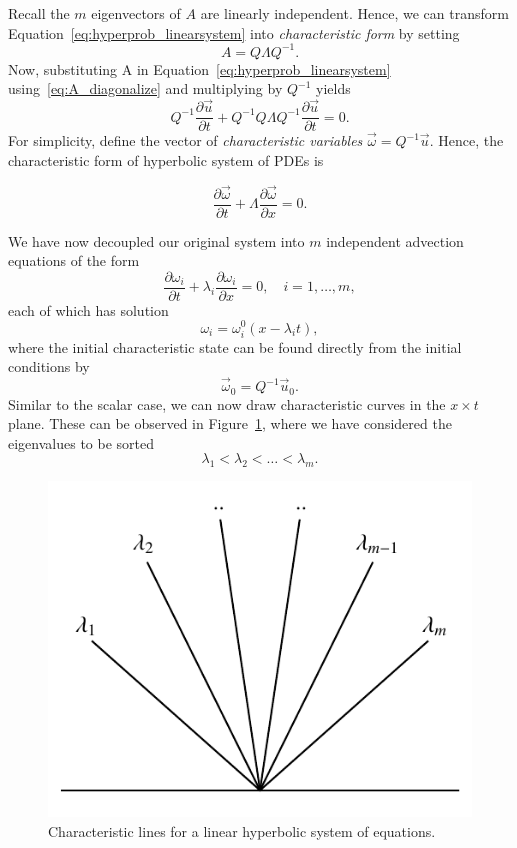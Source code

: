 Recall the $m$ eigenvectors of $A$ are linearly independent. Hence, we can transform Equation~\ref{eq:hyperprob_linearsystem} into \textit{characteristic form} by setting
\begin{equation}
	A = Q \Lambda Q^{-1}.
	\label{eq:A_diagonalize}
\end{equation}
Now, substituting A in Equation~\ref{eq:hyperprob_linearsystem} using~\ref{eq:A_diagonalize} and multiplying by $Q^{-1}$ yields
\begin{equation}
	Q^{-1} \frac{\partial \vec  u}{\partial t} + Q^{-1} Q \Lambda Q^{-1} \frac{\partial \vec u}{\partial t} = 0.
\end{equation}
For simplicity, define the vector of \textit{characteristic variables} $\vec \omega=Q^{-1} \vec{u}$. Hence, the characteristic form of hyperbolic system of PDEs is
\begin{eqBox}
\begin{equation}
	\frac{\partial \vec \omega}{\partial t} + \Lambda \frac{\partial \vec \omega}{\partial x} = 0.
\end{equation}
\end{eqBox}
We have now decoupled our original system into $m$ independent advection equations of the form
\begin{equation}
	\frac{\partial \omega_i}{\partial t} + \lambda_i \frac{\partial \omega_i}{\partial x} = 0,\quad i=1,\ldots,m,
\end{equation}
each of which has solution
\begin{equation}
	\omega_i = \omega_i^0(x-\lambda_i t),
\end{equation}
where the initial characteristic state can be found directly from the initial conditions by
\begin{equation}
	\vec{\omega}_0 = Q^{-1} \vec u_0. 
	\label{eq:initialstatetocharact}
\end{equation}
Similar to the scalar case, we can now draw characteristic curves in the $x\times t$ plane. These can be observed in Figure~\ref{fig:linsys_charact}, where we have considered the eigenvalues to be sorted 
\begin{equation}
	\lambda_1 < \lambda_2 < \ldots < \lambda_m.
\end{equation}
\begin{figure}[htbp]
	\centering
	\includegraphics[width=0.5\linewidth]{Pictures/lsys_characteristics}
	\caption{Characteristic lines for a linear hyperbolic system of equations.}
	\label{fig:linsys_charact}
\end{figure}
